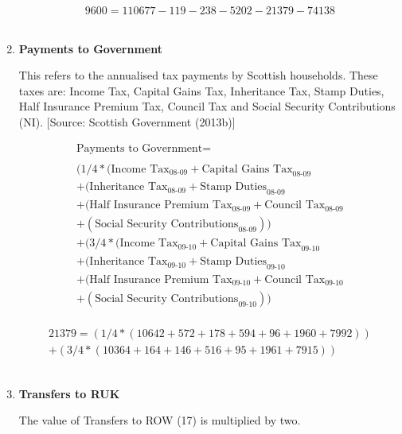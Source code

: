 \begin{enumerate}
\begin{equation} \nonumber
9600 = 110677-119-238-5202-21379-74138
\end{equation}\\


\item \textbf {Payments to Government}

This refers to the annualised tax payments by Scottish households. These taxes are: Income Tax, Capital Gains Tax, Inheritance Tax, Stamp Duties, Half Insurance Premium Tax, Council Tax and Social Security Contributions (NI). [Source: Scottish Government (2013b)]

\begin{equation}
\begin{split}
\text{Payments to Government} =  \\ \\
(1/4*(\text{Income Tax}_\text{08-09}+\text{Capital Gains Tax}_\text{08-09}\\
+(\text{Inheritance Tax}_\text{08-09}+\text{Stamp Duties}_\text{08-09}\\
+(\text{Half Insurance Premium Tax}_\text{08-09}+\text{Council Tax}_\text{08-09}\\
+(\text{Social Security Contributions}_\text{08-09}))\\
+(3/4*(\text{Income Tax}_\text{09-10}+\text{Capital Gains Tax}_\text{09-10}\\
+(\text{Inheritance Tax}_\text{09-10}+\text{Stamp Duties}_\text{09-10}\\
+(\text{Half Insurance Premium Tax}_\text{09-10}+\text{Council Tax}_\text{09-10}\\
+(\text{Social Security Contributions}_\text{09-10}))\\
\end{split} \label{eq:2.5.17}
\end{equation}

\begin{equation} \nonumber
\begin{split}
21379=(1/4*(10642+572+178+594+96+1960+7992))\\
+(3/4*(10364+164+146+516+95+1961+7915))
\end{split}
\end{equation}\\


\item \textbf {Transfers to RUK}

The value of Transfers to ROW (17) is multiplied by two.


\end{enumerate}
